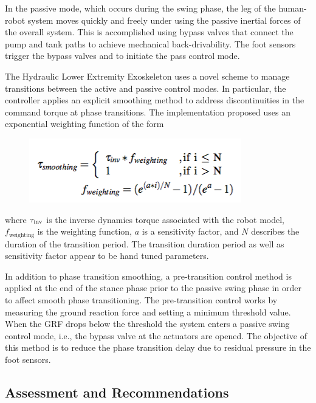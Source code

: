 \begin{refsection}
 In the passive mode, which occurs during the swing phase, the leg of the human-robot system moves quickly and freely under using the passive inertial forces of the overall system.  This is accomplished using bypass valves that connect the pump and tank paths to achieve mechanical back-drivability.  The foot sensors trigger the bypass valves and to initiate the pass control mode.

The Hydraulic Lower Extremity Exoskeleton uses a novel scheme to manage transitions between the active and passive control modes.  In particular, the controller applies an explicit smoothing method to address discontinuities in the command torque at phase transitions.  The implementation proposed uses an exponential weighting function of the form
 \begin{figure}[thpb]
\centering
\includegraphics[width=3.in]{exos/figs/hydLowerExrem/weightingForm}
 \end{figure}
 
 \noindent
 where ${\bf\tau}_\text{inv}$ is the inverse dynamics torque associated with the robot model, $f_\text{weighting}$ is the weighting function, $a$ is a sensitivity factor, and $N$ describes the duration of the transition period.  The transition duration period as well as sensitivity factor appear to be hand tuned parameters. 

In addition to phase transition smoothing, a pre-transition control method is applied at the end of the stance phase prior to the passive swing phase in order to affect smooth phase transitioning.  The pre-transition control works by measuring the ground reaction force and setting a minimum threshold value.  When the GRF drops below the threshold the system enters a passive swing control mode, i.e., the bypass valve at the actuators are opened.  The objective of this method is to reduce the phase transition delay due to residual pressure in the foot sensors. 


 
 \subsection{Assessment and Recommendations}
 

\end{refsection}
